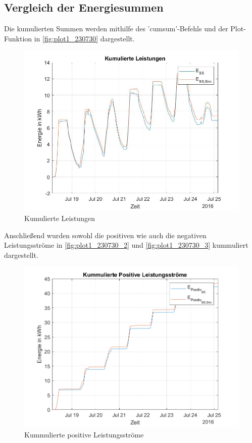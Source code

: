 \subsection{Vergleich der Energiesummen}
Die kumulierten Summen werden mithilfe des 'cumsum'-Befehls und der Plot-Funktion in \autoref{fig:plot1_230730} dargestellt.

\begin{figure}[H]
    \centering
    \includegraphics[width=\textwidth]{Abbildungen/kummulierteleistungen.jpg}
    \caption{Kumulierte Leistungen}
    \label{fig:plot1_230730}
\end{figure}
Anschließend wurden sowohl die positiven wie auch die negativen Leistungsströme in \autoref{fig:plot1_230730_2} und \autoref{fig:plot1_230730_3} kummuliert dargestellt.
\begin{figure}[H]
    \centering
    \includegraphics[width=\textwidth]{Abbildungen/plot5.png}
    \caption{Kummulierte positive Leistungsströme}
    \label{fig:plot1_230730_2}
\end{figure}

